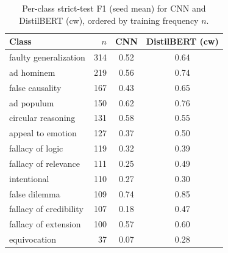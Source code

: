 \begin{table}[t]
\centering
\caption{Per-class strict-test F1 (seed mean) for CNN and DistilBERT (cw), ordered by training frequency $n$.}
\label{tab:perclass}
\begin{tabular}{lrcc}
\toprule
Class & $n$ & CNN & DistilBERT (cw) \\
\midrule
faulty generalization & 314 & 0.52 & 0.64 \\
ad hominem & 219 & 0.56 & 0.74 \\
false causality & 167 & 0.43 & 0.65 \\
ad populum & 150 & 0.62 & 0.76 \\
circular reasoning & 131 & 0.58 & 0.55 \\
appeal to emotion & 127 & 0.37 & 0.50 \\
fallacy of logic & 119 & 0.32 & 0.39 \\
fallacy of relevance & 111 & 0.25 & 0.49 \\
intentional & 110 & 0.27 & 0.30 \\
false dilemma & 109 & 0.74 & 0.85 \\
fallacy of credibility & 107 & 0.18 & 0.47 \\
fallacy of extension & 100 & 0.57 & 0.60 \\
equivocation & 37 & 0.07 & 0.28 \\
\bottomrule
\end{tabular}
\end{table}
